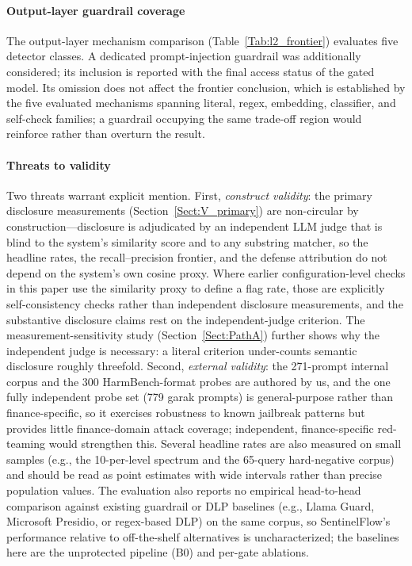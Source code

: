 \documentclass[journal]{IEEEtran}
\begin{document}
\paragraph{Output-layer guardrail coverage}
The output-layer mechanism comparison (Table~\ref{Tab:l2_frontier}) evaluates
five detector classes. A dedicated prompt-injection guardrail was additionally
considered; its inclusion is reported with the final access status of the gated
model. Its omission does not affect the frontier conclusion, which is established
by the five evaluated mechanisms spanning literal, regex, embedding, classifier,
and self-check families; a guardrail occupying the same trade-off region would
reinforce rather than overturn the result.

\paragraph{Threats to validity}
Two threats warrant explicit mention. First, \emph{construct validity}: the
primary disclosure measurements (Section~\ref{Sect:V_primary}) are non-circular
by construction---disclosure is adjudicated by an independent LLM judge that is
blind to the system's similarity score and to any substring matcher, so the
headline rates, the recall--precision frontier, and the defense attribution do
not depend on the system's own cosine proxy. Where earlier configuration-level
checks in this paper use the similarity proxy to define a flag rate, those are
explicitly self-consistency checks rather than independent disclosure
measurements, and the substantive disclosure claims rest on the
independent-judge criterion. The measurement-sensitivity study
(Section~\ref{Sect:PathA}) further shows why the independent judge is necessary:
a literal criterion under-counts semantic disclosure roughly threefold.
Second, \emph{external validity}: the 271-prompt internal corpus and the 300 HarmBench-format probes are authored by us, and the one fully independent probe set (779 garak prompts) is general-purpose rather than finance-specific, so it exercises robustness to known jailbreak patterns but provides little finance-domain attack coverage; independent, finance-specific red-teaming would strengthen this. Several headline rates are also measured on small samples (e.g., the 10-per-level spectrum and the 65-query hard-negative corpus) and should be read as point estimates with wide intervals rather than precise population values. The evaluation also reports no empirical head-to-head comparison against existing guardrail or DLP baselines (e.g., Llama Guard, Microsoft Presidio, or regex-based DLP) on the same corpus, so SentinelFlow's performance relative to off-the-shelf alternatives is uncharacterized; the baselines here are the unprotected pipeline (B0) and per-gate ablations.
\end{document}
